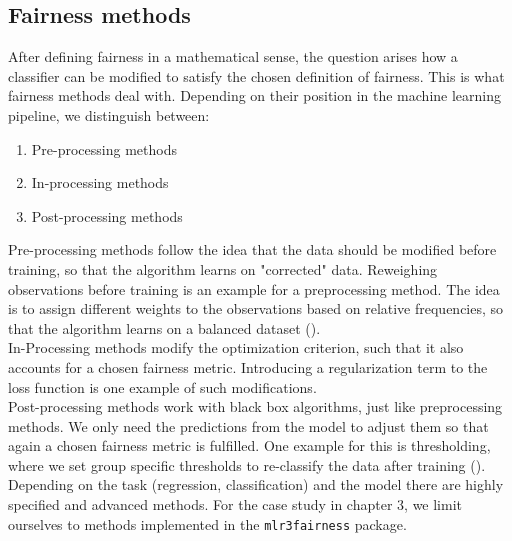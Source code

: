 \subsection{Fairness methods}
After defining fairness in a mathematical sense, the question arises how a classifier can be modified to satisfy the chosen definition of fairness. This is what fairness methods deal with.
Depending on their position in the machine learning pipeline, we distinguish between:
\begin{enumerate}
    \item Pre-processing methods
    \item In-processing methods
    \item Post-processing methods
\end{enumerate}
Pre-processing methods follow the idea that the data should be modified before training, so that the algorithm learns on "corrected" data. Reweighing observations before training is an example for a preprocessing method. The idea is to assign different weights to the observations based on relative frequencies, so that the algorithm learns on a balanced dataset (\cite{caton2024}).\\
In-Processing methods modify the optimization criterion, such that it also accounts for a chosen fairness metric. Introducing a regularization term to the loss function is one example of such modifications.\\
Post-processing methods work with black box algorithms, just like preprocessing methods. We only need the predictions from the model to adjust them so that again a chosen fairness metric is fulfilled. One example for this is thresholding, where we set group specific thresholds to re-classify the data after training (\cite{hardt2016}).
Depending on the task (regression, classification) and the model there are highly specified and advanced methods. For the case study in chapter 3, we limit ourselves to methods implemented in the \texttt{mlr3fairness} package.

